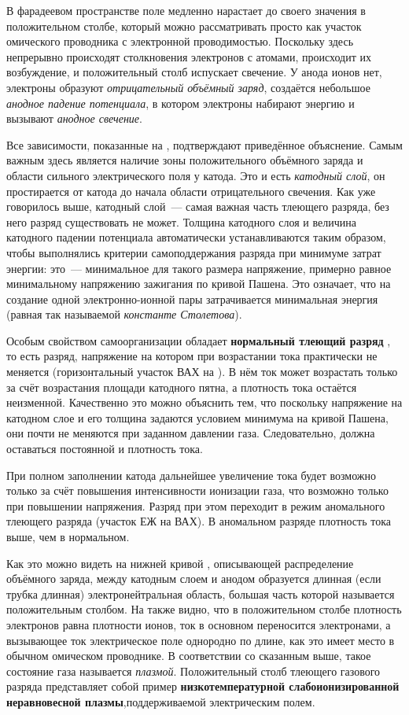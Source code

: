 В фарадеевом пространстве поле медленно нарастает до своего значения в положительном столбе, который можно рассматривать
просто как участок омического проводника с электронной проводимостью. Поскольку здесь непрерывно происходят столкновения
электронов с атомами, происходит их возбуждение, и положительный столб испускает свечение. У анода ионов нет, электроны
образуют \textit{отрицательный объёмный заряд}, создаётся небольшое \textit{анодное падение потенциала}, в котором электроны
набирают энергию и вызывают \textit{анодное свечение}.

Все зависимости, показанные на , подтверждают приведённое объяснение. Самым важным здесь является наличие зоны
положительного объёмного заряда и области сильного электрического поля у катода. Это и есть \textit{катодный слой}, он
простирается от катода до начала области отрицательного свечения. Как уже говорилось выше, катодный слой~--- самая
важная часть тлеющего разряда, без него разряд существовать не может. Толщина катодного слоя и величина катодного падении
потенциала автоматически устанавливаются таким образом, чтобы выполнялись критерии самоподдержания разряда при минимуме
затрат энергии: это~--- минимальное для такого размера напряжение, примерно равное минимальному напряжению зажигания по
кривой Пашена. Это означает, что на создание одной электронно-ионной пары затрачивается минимальная энергия (равная так
называемой \textit{константе Столетова}).

Особым свойством самоорганизации обладает \textbf{нормальный тлеющий разряд} , то есть разряд, напряжение на котором при
возрастании тока практически не меняется (горизонтальный участок ВАХ на ). В нём ток может возрастать только
за счёт возрастания площади катодного пятна, а плотность тока остаётся неизменной. Качественно это можно объяснить тем,
что поскольку напряжение на катодном слое и его толщина задаются условием минимума на кривой Пашена, они почти не
меняются при заданном давлении газа. Следовательно, должна оставаться постоянной и плотность тока.

При полном заполнении катода дальнейшее увеличение тока будет возможно только за счёт повышения интенсивности ионизации
газа, что возможно только при повышении напряжения. Разряд при этом переходит в режим аномального тлеющего разряда
(участок ЕЖ на ВАХ). В аномальном разряде плотность тока выше, чем в нормальном.

Как это можно видеть на нижней кривой , описывающей распределение объёмного заряда, между катодным слоем и анодом
образуется длинная (если трубка длинная) электронейтральная область, большая часть которой называется положительным
столбом. На  также видно, что в положительном столбе плотность электронов равна плотности ионов, ток в основном
переносится электронами, а вызывающее ток электрическое поле однородно по длине, как это имеет место в обычном омическом
проводнике. В соответствии со сказанным выше, такое состояние газа называется \textit{плазмой}. Положительный столб
тлеющего газового разряда представляет собой пример \textbf{низкотемпературной слабоионизированной неравновесной плазмы},поддерживаемой электрическим полем.

